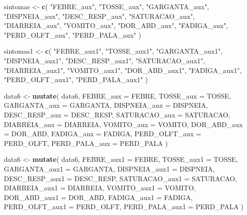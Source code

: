 \documentclass[
]{article}
\newenvironment{Shaded}{\begin{snugshade}}{\end{snugshade}}
\newcommand{\DataTypeTok}[1]{\textcolor[rgb]{0.13,0.29,0.53}{#1}}
\newcommand{\KeywordTok}[1]{\textcolor[rgb]{0.13,0.29,0.53}{\textbf{#1}}}
\newcommand{\NormalTok}[1]{#1}
\newcommand{\StringTok}[1]{\textcolor[rgb]{0.31,0.60,0.02}{#1}}
\begin{document}
\begin{Shaded}
\begin{Highlighting}[]
\NormalTok{sintomas <-}
\StringTok{  }\KeywordTok{c}\NormalTok{(}
    \StringTok{"FEBRE_aux"}\NormalTok{,}
    \StringTok{"TOSSE_aux"}\NormalTok{,}
    \StringTok{"GARGANTA_aux"}\NormalTok{,}
    \StringTok{"DISPNEIA_aux"}\NormalTok{,}
    \StringTok{"DESC_RESP_aux"}\NormalTok{,}
    \StringTok{"SATURACAO_aux"}\NormalTok{,}
    \StringTok{"DIARREIA_aux"}\NormalTok{,}
    \StringTok{"VOMITO_aux"}\NormalTok{,}
    \StringTok{"DOR_ABD_aux"}\NormalTok{,}
    \StringTok{"FADIGA_aux"}\NormalTok{,}
    \StringTok{"PERD_OLFT_aux"}\NormalTok{,}
    \StringTok{"PERD_PALA_aux"}
\NormalTok{  )}

\NormalTok{sintomas1 <-}
\StringTok{  }\KeywordTok{c}\NormalTok{(}
    \StringTok{"FEBRE_aux1"}\NormalTok{,}
    \StringTok{"TOSSE_aux1"}\NormalTok{,}
    \StringTok{"GARGANTA_aux1"}\NormalTok{,}
    \StringTok{"DISPNEIA_aux1"}\NormalTok{,}
    \StringTok{"DESC_RESP_aux1"}\NormalTok{,}
    \StringTok{"SATURACAO_aux1"}\NormalTok{,}
    \StringTok{"DIARREIA_aux1"}\NormalTok{,}
    \StringTok{"VOMITO_aux1"}\NormalTok{,}
    \StringTok{"DOR_ABD_aux1"}\NormalTok{,}
    \StringTok{"FADIGA_aux1"}\NormalTok{,}
    \StringTok{"PERD_OLFT_aux1"}\NormalTok{,}
    \StringTok{"PERD_PALA_aux1"}
\NormalTok{  )}

\NormalTok{data6 <-}
\StringTok{  }\KeywordTok{mutate}\NormalTok{(}
\NormalTok{    data6,}
    \DataTypeTok{FEBRE_aux =}\NormalTok{ FEBRE,}
    \DataTypeTok{TOSSE_aux =}\NormalTok{ TOSSE,}
    \DataTypeTok{GARGANTA_aux =}\NormalTok{ GARGANTA,}
    \DataTypeTok{DISPNEIA_aux =}\NormalTok{ DISPNEIA,}
    \DataTypeTok{DESC_RESP_aux =}\NormalTok{ DESC_RESP,}
    \DataTypeTok{SATURACAO_aux =}\NormalTok{ SATURACAO,}
    \DataTypeTok{DIARREIA_aux =}\NormalTok{ DIARREIA,}
    \DataTypeTok{VOMITO_aux =}\NormalTok{ VOMITO,}
    \DataTypeTok{DOR_ABD_aux =}\NormalTok{ DOR_ABD,}
    \DataTypeTok{FADIGA_aux =}\NormalTok{ FADIGA,}
    \DataTypeTok{PERD_OLFT_aux =}\NormalTok{ PERD_OLFT,}
    \DataTypeTok{PERD_PALA_aux =}\NormalTok{ PERD_PALA}
\NormalTok{  )}

\NormalTok{data6 <-}
\StringTok{  }\KeywordTok{mutate}\NormalTok{(}
\NormalTok{    data6,}
    \DataTypeTok{FEBRE_aux1 =}\NormalTok{ FEBRE,}
    \DataTypeTok{TOSSE_aux1 =}\NormalTok{ TOSSE,}
    \DataTypeTok{GARGANTA_aux1 =}\NormalTok{ GARGANTA,}
    \DataTypeTok{DISPNEIA_aux1 =}\NormalTok{ DISPNEIA,}
    \DataTypeTok{DESC_RESP_aux1 =}\NormalTok{ DESC_RESP,}
    \DataTypeTok{SATURACAO_aux1 =}\NormalTok{ SATURACAO,}
    \DataTypeTok{DIARREIA_aux1 =}\NormalTok{ DIARREIA,}
    \DataTypeTok{VOMITO_aux1 =}\NormalTok{ VOMITO,}
    \DataTypeTok{DOR_ABD_aux1 =}\NormalTok{ DOR_ABD,}
    \DataTypeTok{FADIGA_aux1 =}\NormalTok{ FADIGA,}
    \DataTypeTok{PERD_OLFT_aux1 =}\NormalTok{ PERD_OLFT,}
    \DataTypeTok{PERD_PALA_aux1 =}\NormalTok{ PERD_PALA}
\NormalTok{  )}


\end{Highlighting}
\end{Shaded}
\end{document}
